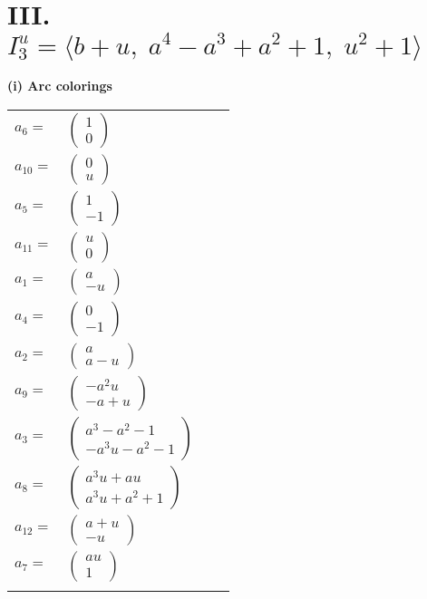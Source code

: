 \documentclass[1p]{elsarticle_modified}
\theoremstyle{definition}
\begin{document}
\centering \section*{III. $I^u_{3}= \langle b+u,\;a^4- a^3+a^2+1,\;u^2+1 \rangle$}
\flushleft \textbf{(i) Arc colorings}\\
\begin{tabular}{m{7pt} m{180pt} m{7pt} m{180pt} }
\flushright $a_{6}=$&$\begin{pmatrix}1\\0\end{pmatrix}$ \\
\flushright $a_{10}=$&$\begin{pmatrix}0\\u\end{pmatrix}$ \\
\flushright $a_{5}=$&$\begin{pmatrix}1\\-1\end{pmatrix}$ \\
\flushright $a_{11}=$&$\begin{pmatrix}u\\0\end{pmatrix}$ \\
\flushright $a_{1}=$&$\begin{pmatrix}a\\- u\end{pmatrix}$ \\
\flushright $a_{4}=$&$\begin{pmatrix}0\\-1\end{pmatrix}$ \\
\flushright $a_{2}=$&$\begin{pmatrix}a\\a- u\end{pmatrix}$ \\
\flushright $a_{9}=$&$\begin{pmatrix}- a^2 u\\- a+u\end{pmatrix}$ \\
\flushright $a_{3}=$&$\begin{pmatrix}a^3- a^2-1\\- a^3 u- a^2-1\end{pmatrix}$ \\
\flushright $a_{8}=$&$\begin{pmatrix}a^3 u+a u\\a^3 u+a^2+1\end{pmatrix}$ \\
\flushright $a_{12}=$&$\begin{pmatrix}a+u\\- u\end{pmatrix}$ \\
\flushright $a_{7}=$&$\begin{pmatrix}a u\\1\end{pmatrix}$\\&\end{tabular}
\end{document}
